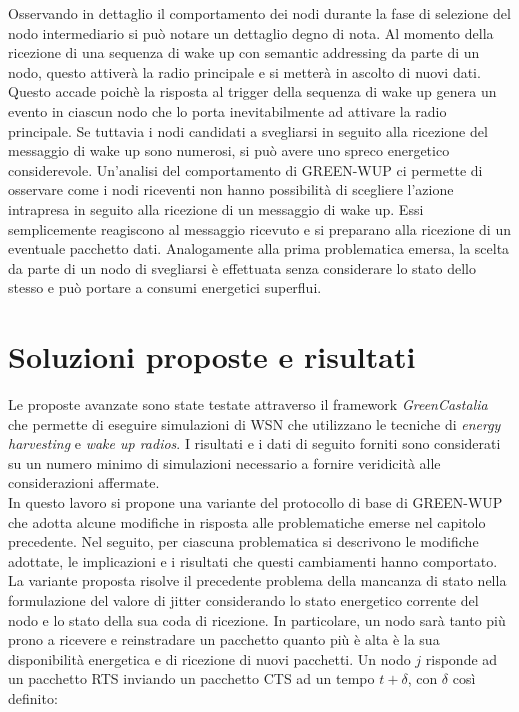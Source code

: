 \documentclass{report}
\begin{document}
Osservando in dettaglio il comportamento dei nodi durante la fase di selezione del nodo intermediario si può notare un dettaglio degno di nota.
Al momento della ricezione di una sequenza di wake up con semantic addressing da parte di un nodo, questo attiverà la radio principale e si metterà in
ascolto di nuovi dati. Questo accade poichè la risposta al trigger della sequenza di wake up genera un evento in ciascun nodo che lo porta inevitabilmente
ad attivare la radio principale. Se tuttavia i nodi candidati a svegliarsi in seguito alla ricezione del messaggio di wake up sono numerosi, si può avere uno
spreco energetico considerevole. Un'analisi del comportamento di GREEN-WUP ci permette di osservare come i nodi riceventi non hanno possibilità di scegliere l'azione
intrapresa in seguito alla ricezione di un messaggio di wake up. Essi semplicemente reagiscono al messaggio ricevuto e si preparano alla ricezione di un
eventuale pacchetto dati. Analogamente alla prima problematica emersa, la scelta da parte di un nodo di svegliarsi è effettuata senza considerare lo stato dello
stesso e può portare a consumi energetici superflui.

\section{Soluzioni proposte e risultati}

Le proposte avanzate sono state testate attraverso il framework \emph{GreenCastalia} che permette di eseguire simulazioni di WSN che utilizzano le tecniche
di \emph{energy harvesting} e \emph{wake up radios}. I risultati e i dati di seguito forniti sono considerati su un numero minimo di simulazioni
necessario a fornire veridicità alle considerazioni affermate.\\

In questo lavoro si propone una variante del protocollo di base di GREEN-WUP che adotta alcune modifiche in risposta alle problematiche emerse nel capitolo
precedente. Nel seguito, per ciascuna problematica si descrivono le modifiche adottate, le implicazioni e i risultati che questi cambiamenti hanno comportato.\\

La variante proposta risolve il precedente problema della mancanza di stato nella formulazione del valore di jitter considerando lo stato energetico
corrente del nodo e lo stato della sua coda di ricezione. In particolare, un nodo sarà tanto più prono a ricevere e reinstradare un pacchetto quanto
più è alta è la sua disponibilità energetica e di ricezione di nuovi pacchetti. Un nodo $j$ risponde ad un pacchetto RTS inviando un pacchetto CTS
ad un tempo $t+\delta$, con $\delta$ così definito:
\end{document}
